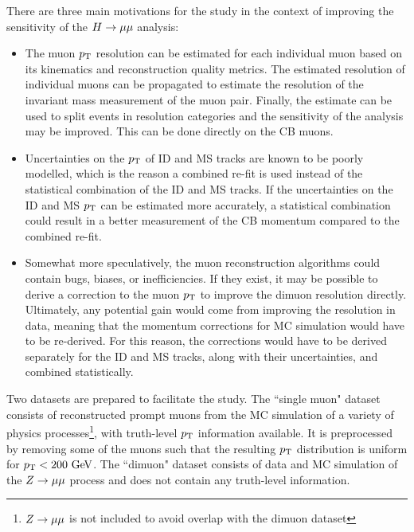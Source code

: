 There are three main motivations for the study in the context of
improving the sensitivity of the $H \rightarrow \mu\mu$ analysis:
\begin{itemize}
\item The muon $p_{\text{T}}$ resolution can be estimated for each individual muon
based on its kinematics and reconstruction quality metrics. The estimated
resolution of individual muons can be propagated to estimate the resolution
of the invariant mass measurement of the muon pair. Finally, the estimate
can be used to split events in resolution categories and the sensitivity of
the analysis may be improved. This can be done directly on the CB muons.

\item Uncertainties on the $p_{\text{T}}$ of ID and MS tracks are known to be
poorly modelled, which is the reason a combined re-fit is used instead of
the statistical combination of the ID and MS tracks. If the uncertainties
on the ID and MS $p_{\text{T}}$ can be estimated more accurately, a statistical
combination could result in a better measurement of the CB momentum compared to the
combined re-fit.

\item Somewhat more speculatively, the muon reconstruction
algorithms could contain bugs, biases, or inefficiencies. If they exist,
it may be possible to 
derive a correction to the muon $p_{\text{T}}$ to improve the dimuon resolution
directly. Ultimately, any potential gain would come from improving the
resolution in data, meaning that the momentum corrections for MC
simulation would have to be re-derived. For this reason, the
corrections would have to be derived separately for the ID and MS
tracks, along with their uncertainties, and combined statistically.
\end{itemize}
Two datasets are prepared to facilitate the study. The ``single muon"
dataset consists of reconstructed prompt muons from the MC simulation
of a variety of physics processes\footnote{$Z \rightarrow \mu\mu$ is not included to avoid overlap
with the dimuon dataset}, with truth-level $p_{\text{T}}$ information
available. It is preprocessed by removing some of the muons such that the resulting
$p_{\text{T}}$ distribution is uniform for $p_{\text{T}} < 200~\text{Ge\kern -0.1em V}$. The ``dimuon"
dataset consists of data and MC simulation of the $Z \rightarrow \mu\mu$ process
and does not contain any truth-level information.

